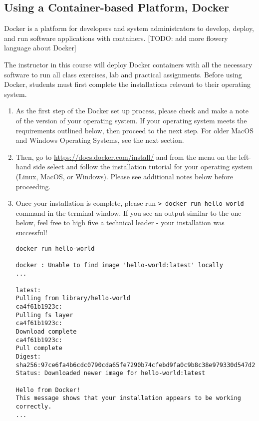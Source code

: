 \vspace*{-.2in}
\subsection*{Using a Container-based Platform, Docker}
\vspace*{-.1in}

Docker is a platform for developers and system administrators to develop, deploy, and run software applications with containers. [TODO: add more flowery language about Docker]

The instructor in this course will deploy Docker containers with all the necessary software to run all class exercises, lab and practical assignments. Before using Docker, students must first complete the installations relevant to their operating system. 

\begin{enumerate}
	\item As the first step of the Docker set up process, please check and make a note of the version of your operating system. If your operating system meets the requirements outlined below, then proceed to the next step. For older MacOS and Windows Operating Systems, see the next section.
	\item Then, go to \url{https://docs.docker.com/install/} and  from the menu on the left-hand side select and follow the installation tutorial for your operating system (Linux, MacOS, or Windows). Please see additional notes below before proceeding.
	\item Once your installation is complete, please run {\tt > docker run hello-world} command in the terminal window. If you see an output similar to the one below, feel free to high five a technical leader - your installation was successful!

\begin{verbatim}	
docker run hello-world

docker : Unable to find image 'hello-world:latest' locally
...

latest:
Pulling from library/hello-world
ca4f61b1923c:
Pulling fs layer
ca4f61b1923c:
Download complete
ca4f61b1923c:
Pull complete
Digest: sha256:97ce6fa4b6cdc0790cda65fe7290b74cfebd9fa0c9b8c38e979330d547d22ce1
Status: Downloaded newer image for hello-world:latest

Hello from Docker!
This message shows that your installation appears to be working correctly.
...
\end{verbatim}

\end{enumerate}

